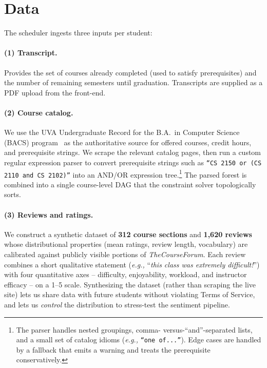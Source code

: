 \documentclass[10pt,letterpaper]{article}
\newcommand{\code}[1]{\texttt{\small #1}}
\newcommand{\eg}{\emph{e.g.,}}
\begin{document}
\section{Data}

The scheduler ingests three inputs per student:

\paragraph{(1) Transcript.} Provides the set of courses already completed
(used to satisfy prerequisites) and the number of remaining semesters
until graduation. Transcripts are supplied as a PDF upload from the front-end.

\paragraph{(2) Course catalog.} We use the UVA Undergraduate Record for the
B.A.\ in Computer Science (BACS) program~\cite{UVAUndergradRecord} as the
authoritative source for offered courses, credit hours, and prerequisite
strings. We scrape the relevant catalog pages, then run a custom regular
expression parser to convert prerequisite strings such as
\code{``CS 2150 or (CS 2110 and CS 2102)''} into an AND/OR
expression tree.\footnote{The parser handles nested groupings, comma-
versus-``and''-separated lists, and a small set of catalog idioms (\eg{}
\code{``one of...''}). Edge cases are handled by a fallback that emits a
warning and treats the prerequisite conservatively.} The parsed forest is
combined into a single course-level DAG that the constraint solver
topologically sorts.

\paragraph{(3) Reviews and ratings.} We construct a synthetic dataset of
\textbf{312 course sections} and \textbf{1{,}620 reviews} whose distributional
properties (mean ratings, review length, vocabulary) are calibrated against
publicly visible portions of \emph{TheCourseForum}. Each review combines a
short qualitative statement (\eg{} ``\emph{this class was extremely
difficult!}'') with four quantitative axes -- difficulty, enjoyability,
workload, and instructor efficacy -- on a 1--5 scale. Synthesizing the
dataset (rather than scraping the live site) lets us share data with future
students without violating Terms of Service, and lets us \emph{control} the
distribution to stress-test the sentiment pipeline.
\end{document}
